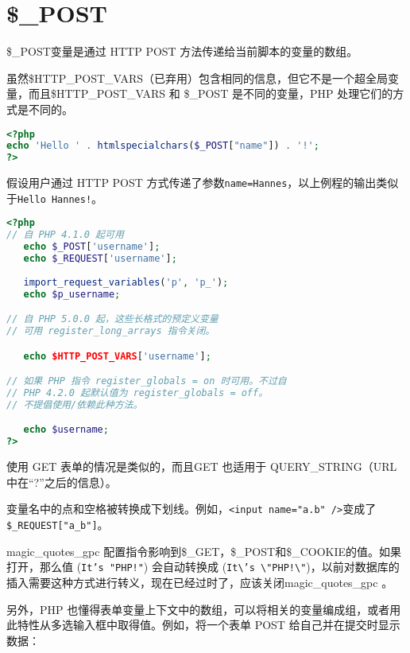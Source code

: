 \section{\$\_POST}

\$\_POST变量是通过 HTTP POST 方法传递给当前脚本的变量的数组。

虽然\$HTTP\_POST\_VARS（已弃用）包含相同的信息，但它不是一个超全局变量，而且\$HTTP\_POST\_VARS 和 \$\_POST 是不同的变量，PHP 处理它们的方式是不同的。




\begin{lstlisting}[language=PHP]
<?php
echo 'Hello ' . htmlspecialchars($_POST["name"]) . '!';
?>
\end{lstlisting}


假设用户通过 HTTP POST 方式传递了参数\texttt{name=Hannes}，以上例程的输出类似于\texttt{Hello Hannes!}。


\begin{lstlisting}[language=PHP]
<?php
// 自 PHP 4.1.0 起可用
   echo $_POST['username'];
   echo $_REQUEST['username'];
   
   import_request_variables('p', 'p_');
   echo $p_username;

// 自 PHP 5.0.0 起，这些长格式的预定义变量
// 可用 register_long_arrays 指令关闭。

   echo $HTTP_POST_VARS['username'];

// 如果 PHP 指令 register_globals = on 时可用。不过自
// PHP 4.2.0 起默认值为 register_globals = off。
// 不提倡使用/依赖此种方法。

   echo $username;
?>
\end{lstlisting}

使用 GET 表单的情况是类似的，而且GET 也适用于 QUERY\_STRING（URL 中在“?”之后的信息）。

变量名中的点和空格被转换成下划线。例如，\texttt{<input name="a.b" />}变成了\texttt{\$\_REQUEST["a\_b"]}。

magic\_quotes\_gpc 配置指令影响到\$\_GET，\$\_POST和\$\_COOKIE的值。如果打开，那么值 (\texttt{It's "PHP!"}) 会自动转换成 (\texttt{It\textbackslash 's \textbackslash "PHP!\textbackslash "})，以前对数据库的插入需要这种方式进行转义，现在已经过时了，应该关闭magic\_quotes\_gpc 。

另外，PHP 也懂得表单变量上下文中的数组，可以将相关的变量编成组，或者用此特性从多选输入框中取得值。例如，将一个表单 POST 给自己并在提交时显示数据：

